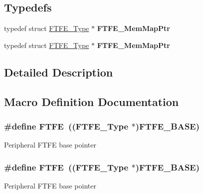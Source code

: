 \subsection*{Typedefs}
\begin{DoxyCompactItemize}
\item 
typedef struct \hyperlink{structFTFE__Type}{F\+T\+F\+E\+\_\+\+Type} $\ast$ {\bfseries F\+T\+F\+E\+\_\+\+Mem\+Map\+Ptr}\hypertarget{group__FTFE__Peripheral__Access__Layer_gac37467217ccb2dcaf0a50d86892b6fdd}{}\label{group__FTFE__Peripheral__Access__Layer_gac37467217ccb2dcaf0a50d86892b6fdd}

\item 
typedef struct \hyperlink{structFTFE__Type}{F\+T\+F\+E\+\_\+\+Type} $\ast$ {\bfseries F\+T\+F\+E\+\_\+\+Mem\+Map\+Ptr}\hypertarget{group__FTFE__Peripheral__Access__Layer_gac37467217ccb2dcaf0a50d86892b6fdd}{}\label{group__FTFE__Peripheral__Access__Layer_gac37467217ccb2dcaf0a50d86892b6fdd}

\end{DoxyCompactItemize}


\subsection{Detailed Description}


\subsection{Macro Definition Documentation}
\subsubsection[{\texorpdfstring{F\+T\+FE}{FTFE}}]{\setlength{\rightskip}{0pt plus 5cm}\#define F\+T\+FE~(({\bf F\+T\+F\+E\+\_\+\+Type} $\ast$){\bf F\+T\+F\+E\+\_\+\+B\+A\+SE})}\hypertarget{group__FTFE__Peripheral__Access__Layer_ga08e0af7718eb3edb5211071bc350605c}{}\label{group__FTFE__Peripheral__Access__Layer_ga08e0af7718eb3edb5211071bc350605c}
Peripheral F\+T\+FE base pointer 
\subsubsection[{\texorpdfstring{F\+T\+FE}{FTFE}}]{\setlength{\rightskip}{0pt plus 5cm}\#define F\+T\+FE~(({\bf F\+T\+F\+E\+\_\+\+Type} $\ast$){\bf F\+T\+F\+E\+\_\+\+B\+A\+SE})}\hypertarget{group__FTFE__Peripheral__Access__Layer_ga08e0af7718eb3edb5211071bc350605c}{}\label{group__FTFE__Peripheral__Access__Layer_ga08e0af7718eb3edb5211071bc350605c}
Peripheral F\+T\+FE base pointer 
